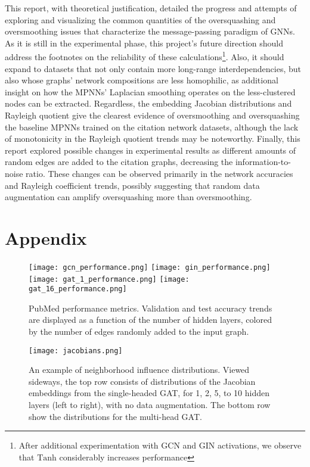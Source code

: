 \documentclass[11pt]{article}
\begin{document}
This report, with theoretical justification, detailed the progress and attempts of exploring and visualizing the common quantities of the oversquashing and oversmoothing issues that characterize the message-passing paradigm of GNNs. As it is still in the experimental phase, this project's future direction should address the footnotes on the reliability of these calculations\footnote{After additional experimentation with GCN and GIN activations, we observe that $\text{Tanh}$ considerably increases performance}. Also, it should expand to datasets that not only contain more long-range interdependencies, but also whose graphs' network compositions are less homophilic, as additional insight on how the MPNNs' Laplacian smoothing operates on the less-clustered nodes can be extracted. Regardless, the embedding Jacobian distributions and Rayleigh quotient give the clearest evidence of oversmoothing and oversquashing the baseline MPNNs trained on the citation network datasets, although the lack of monotonicity in the Rayleigh quotient trends may be noteworthy. Finally, this report explored possible changes in experimental results as different amounts of random edges are added to the citation graphs, decreasing the information-to-noise ratio. These changes can be observed primarily in the network accuracies and Rayleigh coefficient trends, possibly suggesting that random data augmentation can amplify oversquashing more than oversmoothing.   





\onecolumn

\section{Appendix}

\begin{figure}[h]
    \centering
    \texttt{[image: gcn\_performance.png]}
    \texttt{[image: gin\_performance.png]}
    \texttt{[image: gat\_1\_performance.png]}
    \texttt{[image: gat\_16\_performance.png]}
    \caption{PubMed performance metrics. Validation and test accuracy trends are displayed as a function of the number of hidden layers, colored by the number of edges randomly added to the input graph.}
    \label{fig:performance}
\end{figure}

\begin{figure}[h]
    \centering
    \texttt{[image: jacobians.png]}
    \caption{An example of neighborhood influence distributions. Viewed sideways, the top row consists of distributions of the Jacobian embeddings from the single-headed GAT, for 1, 2, 5, to 10 hidden layers (left to right), with no data augmentation. The bottom row show the distributions for the multi-head GAT.}
    \label{fig:jacobian}
\end{figure}
\end{document}
